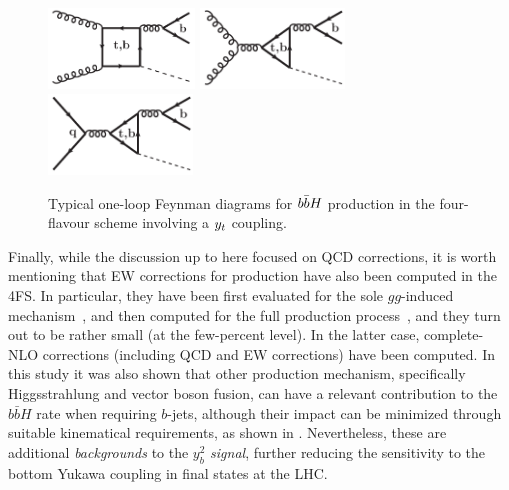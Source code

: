 \documentclass[11pt,a4paper]{article}
\begin{document}
\begin{figure}
\begin{center}
    \includegraphics[height=2.15cm]{./diags/gg-bbH1loop2tb_4F.pdf}\hspace{1.2cm}
    \includegraphics[height=2.15cm]{./diags/gg-bbH1loop5tb.pdf}\hspace{1.2cm}
    \includegraphics[height=2.15cm]{./diags/qq-bbH1loop2tb.pdf}
  \caption{Typical one-loop Feynman diagrams for $b\bar{b}H$ production in the four-flavour scheme involving a $y_t$ coupling.}
  \label{fig:bbhyt}
\end{center}
\end{figure}

Finally, while the discussion up to here focused on QCD corrections, it is worth mentioning that EW corrections for \bbH{} production have also been computed in the 
4FS. %
In particular, they have been first evaluated for the sole $gg$-induced mechanism~\cite{Zhang:2017mdz}, and then computed for the full production
process~\cite{Pagani:2020rsg}, and they turn out to be rather small (at the few-percent level). 
In the latter case, complete-NLO corrections (including QCD and EW corrections)
have been computed. In this study it was also shown that other production mechanism, specifically Higgsstrahlung and vector boson fusion, 
can have a relevant contribution to the $b\bar b H$ rate when requiring $b$-jets, although their impact can be minimized through
suitable kinematical requirements, as shown in . Nevertheless, these are additional \textit{backgrounds} to the $y_b^2$ \textit{signal}, 
further reducing the sensitivity to the bottom Yukawa coupling in \bbH{} final states at the LHC.
\end{document}
